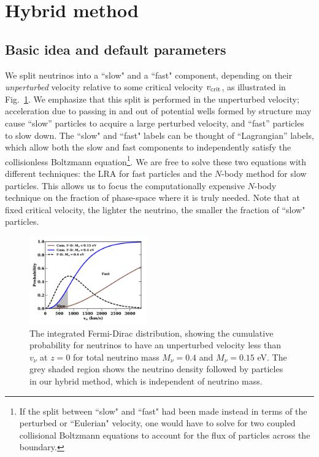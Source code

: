 \documentclass[useAMS, usenatbib]{mnras}
\begin{document}
\section{Hybrid method} \label{sec:hybrid}

\subsection{Basic idea and default parameters}

We split neutrinos into a ``slow" and a ``fast" component, depending on their \emph{unperturbed} velocity relative to some critical velocity $v_{\rm crit}$, as illustrated in Fig.~\ref{fig:fddistribution}. We emphasize that this split is performed in the unperturbed velocity; acceleration due to passing in and out of potential wells formed by structure may cause ``slow'' particles to acquire a large perturbed velocity, and ``fast'' particles to slow down. The ``slow" and ``fast" labels can be thought of ``Lagrangian'' labels, which allow both the slow and fast components to independently satisfy the collisionless Boltzmann equation\footnote{If the split between ``slow" and ``fast" had been made instead in terms of the perturbed or ``Eulerian" velocity, one would have to solve for two coupled collisional Boltzmann equations to account for the flux of particles across the boundary.}. We are free to solve these two equations with different techniques: the LRA for fast particles and the $N$-body method for slow particles. This allows us to focus the computationally expensive $N$-body technique on the fraction of phase-space where it is truly needed. Note that at fixed critical velocity, the lighter the neutrino, the smaller the fraction of ``slow" particles.

\begin{figure}
\includegraphics[width=0.45\textwidth]{nuplots/fermidirac.pdf}
  \caption{The integrated Fermi-Dirac distribution, showing the cumulative probability for neutrinos to have an unperturbed velocity less than $v_\nu$ at $z=0$ for total neutrino mass $M_\nu = 0.4$ and $M_\nu = 0.15$ eV.
  The grey shaded region shows the neutrino density followed by particles in our hybrid method, which is independent of neutrino mass.
  }
  \label{fig:fddistribution}
\end{figure}
\end{document}
